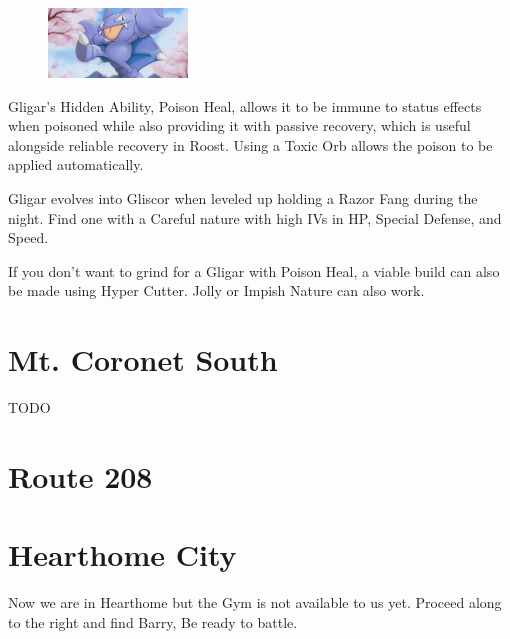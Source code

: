 \documentclass[11pt]{article}
\begin{document}
\begin{mdframed}[style=MyFrame,nobreak=true,frametitle={Pokemon Spotlight: Gligar}]

\begin{figure}
\includegraphics[width=0.33\textwidth]{walkthrough/Sinnoh/spotlight-gligar}
\label{fig:spotlight-gligar}
\end{figure}

Gligar's Hidden Ability, Poison Heal, allows it to be immune to status effects
when poisoned while also providing it with passive recovery, which is useful
alongside reliable recovery in Roost.
Using a Toxic Orb allows the poison to be applied automatically.

Gligar evolves into Gliscor when leveled up holding a Razor Fang during the night.
Find one with a Careful nature with high IVs in HP, Special Defense, and Speed.

If you don't want to grind for a Gligar with Poison Heal, a viable build can
also be made using Hyper Cutter.
Jolly or Impish Nature can also work.

\end{mdframed}

\section{Mt. Coronet South}\label{sec:mt.-coronet-south}
TODO

\section{Route 208}\label{sec:Route_208}






\section{Hearthome City}\label{sec:hearthome-city}
Now we are in Hearthome but the Gym is not available to us yet.
Proceed along to the right and find Barry, Be ready to battle.
\end{document}

